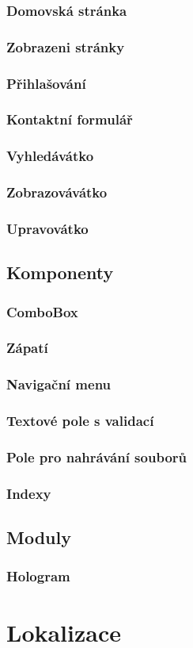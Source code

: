 \subsubsection{Domovská stránka}
\subsubsection{Zobrazeni stránky}
\subsubsection{Přihlašování}
\subsubsection{Kontaktní formulář}
\subsubsection{Vyhledávátko}
\subsubsection{Zobrazovávátko}
\subsubsection{Upravovátko}

\subsection{Komponenty}
\subsubsection{ComboBox}
\subsubsection{Zápatí}
\subsubsection{Navigační menu}
\subsubsection{Textové pole s validací}
\subsubsection{Pole pro nahrávání souborů}
\subsubsection{Indexy}

\subsection{Moduly}
\subsubsection{Hologram}

\section{Lokalizace}
